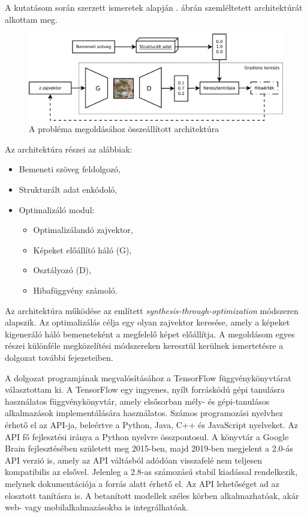 
A kutatásom során szerzett ismeretek alapján . ábrán szemléltetett architektúrát alkottam meg.

\begin{figure}[h]
\centering
\includegraphics[width=15cm]{images/architecture.png}
\caption{A probléma megoldásához összeállított architektúra}
\label{fig:architecture}
\end{figure}

Az architektúra részei az alábbiak:

\begin{itemize}
	\item Bemeneti szöveg feldolgozó,
	\item Strukturált adat enkódoló,
	\item Optimalizáló modul:
		\begin{itemize}
			\item Optimalizálandó zajvektor,
			\item Képeket előállító háló (G),
			\item Osztályozó (D),
			\item Hibafüggvény számoló.
		\end{itemize}
\end{itemize}

Az architektúra működése az említett \textit{synthesis-through-optimization} módszeren alapszik. Az optimalizálás célja egy olyan zajvektor keresése, amely a képeket kigeneráló háló bemeneteként a megfelelő képet előállítja.
A megoldásom egyes részei különféle megközelítési módszereken keresztül kerülnek ismertetésre a dolgozat további fejezeteiben.



A dolgozat programjának megvalósításához a TensorFlow függvénykönyvtárat választottam ki. A TensorFlow egy ingyenes, nyílt forráskódú gépi tanulásra használatos függvénykönyvtár, amely elsősorban mély- és gépi-tanulásos alkalmazások implementálására használatos. Számos programozási nyelvhez érhető el az API-ja, beleértve a Python, Java, C++ és JavaScript nyelveket. Az API fő fejlesztési iránya a Python nyelvre összpontosul. A könyvtár a Google Brain fejlesztésében született meg 2015-ben, majd 2019-ben megjelent a 2.0-ás API verzió is, amely az API váltásból adódóan visszafelé nem teljesen kompatibilis az elsővel. Jelenleg a 2.8-as számozású stabil kiadással rendelkezik, melynek dokumentációja a \cite{tensorflow} forrás alatt érhető el. Az API lehetőséget ad az elosztott tanításra is. A betanított modellek széles körben alkalmazhatóak, akár web- vagy mobilalkalmazásokba is integrálhatóak. 

